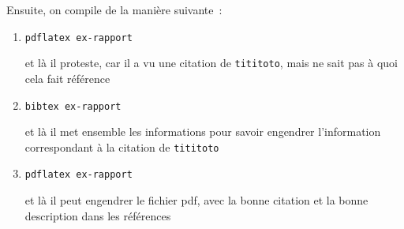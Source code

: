 \documentclass{article}
\begin{document}
Ensuite, on compile de la manière suivante~:
\begin{enumerate}
\item \texttt{pdflatex ex-rapport}

et là il proteste, car il a vu une citation de \texttt{tititoto}, mais
ne sait pas à quoi cela fait référence

\item \texttt{bibtex ex-rapport}

et là il met ensemble les informations pour savoir engendrer
l'information correspondant à la citation de \texttt{tititoto}

\item \texttt{pdflatex ex-rapport}

et là il peut engendrer le fichier pdf, avec la bonne citation et la
bonne description dans les références
\end{enumerate}




\end{document}
